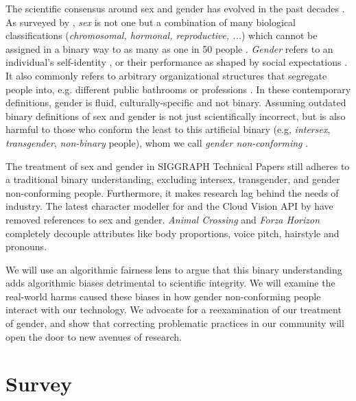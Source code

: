 \documentclass[nonacm,sigconf,review,balance=false]{acmart}
\begin{document}



The scientific consensus around sex and gender has evolved in the past decades \cite{pmid30377332}. As surveyed by \citet{fausto2012sex}, \emph{sex} is not one but a combination of many biological classifications (\emph{chromosomal, hormonal, reproductive, ...}) which cannot be assigned in a binary way to as many as one in 50 people \cite{blackless2000sexually}.
\emph{Gender} refers to an individual's self-identity \cite{money1972man}, or their performance as shaped by social expectations \cite{butler2003gender}. It also commonly refers to arbitrary organizational structures that segregate people into, e.g. different public bathrooms or professions \cite{lorber1994paradoxes}. In these contemporary definitions, gender is fluid, culturally-specific and not binary. Assuming outdated binary definitions of sex and gender is not just scientifically incorrect, but is also harmful to those who conform the least to this artificial binary (e.g, \emph{intersex}, \emph{transgender}, \emph{non-binary} people), whom we call \emph{gender non-conforming} \cite{un2015report}.

The treatment of sex and gender in SIGGRAPH Technical Papers
still adheres to a traditional binary understanding, excluding intersex, transgender, and
gender non-conforming people. Furthermore, it makes research lag behind the needs of industry. The latest character modeller for \citet{metahuman} and the Cloud Vision API by \citet{googlegender} have removed references to sex and gender. \emph{Animal Crossing} and \emph{Forza Horizon} completely decouple attributes like body proportions, voice pitch, hairstyle and pronouns. 

We will use an algorithmic fairness lens to argue that this binary understanding adds algorithmic biases detrimental to scientific integrity.
We will examine the real-world harms caused these biases in how gender non-conforming people interact with
our technology. We advocate for a reexamination of our treatment of gender, and show that correcting problematic practices in
our community will open the door to new avenues of research.

\vspace{-0.1cm}
\section{Survey}
\end{document}
